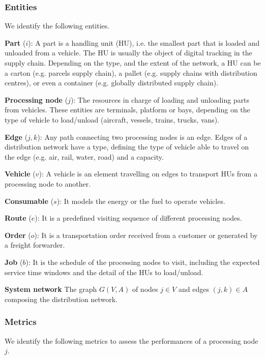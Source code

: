 \subsubsection{Entities}
We identify the following entities.\par
\textbf{Part} ($i$): A part is a handling unit (HU), i.e. the smallest part that is loaded and unloaded from a vehicle. The HU is usually the object of digital tracking in the supply chain. Depending on the type, and the extent of the network, a HU can be a carton (e.g. parcels supply chain), a pallet (e.g. supply chains with distribution centres), or even a container (e.g. globally distributed supply chain). \par

\textbf{Processing node} ($j$): The resources in charge of loading and unloading parts from vehicles. These entities are terminals, platform or bays, depending on the type of vehicle to load/unload (aircraft, vessels, trains, trucks, vans). \par

\textbf{Edge} ($j,k$): Any path connecting two processing nodes is an edge. Edges of a distribution network have a type, defining the type of vehicle able to travel on the edge (e.g. air, rail, water, road) and a capacity. \par

\textbf{Vehicle} ($v$): A vehicle is an element travelling on edges to transport HUs from a processing node to another. \par

\textbf{Consumable} ($s$): It models the energy or the fuel to operate vehicles. \par

\textbf{Route} ($e$): It is a predefined visiting sequence of different processing nodes. \par

\textbf{Order} ($o$): It is a transportation order received from a customer or generated by a freight forwarder. \par

\textbf{Job} ($b$): It is the schedule of the processing nodes to visit, including the expected service time windows and the detail of the HUs to load/unload. \par

\textbf{System network} The graph $G(V,A)$ of nodes $j\in V$ and edges $\left(j,k\right)\in A$ composing the distribution network.

\subsubsection{Metrics}
We identify the following metrics to assess the performances of a processing node $j$.\par

